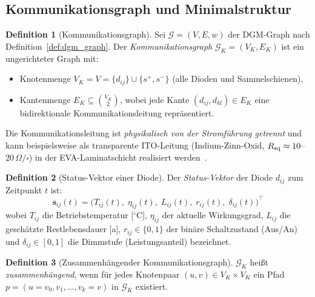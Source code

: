 ﻿\documentclass[a4paper,12pt]{article}
\theoremstyle{definition}
\newtheorem{definition}{Definition}[section]
\theoremstyle{remark}
\begin{document}
\subsection{Kommunikationsgraph und Minimalstruktur}
\label{sec:komm_graph}

\begin{definition}[Kommunikationsgraph]
\label{def:komm_graph}
Sei $\mathcal{G} = (V, E, w)$ der DGM-Graph nach Definition~\ref{def:dgm_graph}.
Der \emph{Kommunikationsgraph} $\mathcal{G}_K = (V_K, E_K)$ ist ein
ungerichteter Graph mit:
\begin{itemize}
  \item Knotenmenge $V_K = V = \{d_{ij}\} \cup \{s^+, s^-\}$ (alle Dioden
        und Sammelschienen),
  \item Kantenmenge $E_K \subseteq \binom{V_K}{2}$, wobei jede Kante
        $(d_{ij}, d_{kl}) \in E_K$ eine bidirektionale Kommunikationsleitung
        repräsentiert.
\end{itemize}
Die Kommunikationsleitung ist \emph{physikalisch von der Stromführung getrennt}
und kann beispielsweise als transparente ITO-Leitung
(Indium-Zinn-Oxid, $R_{\rm sq} \approx 10$--$20\,\Omega/\square$)
in der EVA-Laminatschicht realisiert werden~\cite{Beckhoff2023}.
\end{definition}

\begin{definition}[Status-Vektor einer Diode]
\label{def:statusvektor}
Der \emph{Status-Vektor} der Diode $d_{ij}$ zum Zeitpunkt $t$ ist:
\begin{equation}
  \mathbf{s}_{ij}(t) = \bigl(T_{ij}(t),\; \eta_{ij}(t),\; L_{ij}(t),\;
                              r_{ij}(t),\; \delta_{ij}(t)\bigr)^{\!\top}
  \label{eq:statusvektor}
\end{equation}
wobei $T_{ij}$ die Betriebstemperatur [$^{\circ}$C], $\eta_{ij}$ der aktuelle
Wirkungsgrad, $L_{ij}$ die geschätzte Restlebensdauer [a],
$r_{ij} \in \{0, 1\}$ der binäre Schaltzustand (Aus/An) und
$\delta_{ij} \in [0,1]$ die Dimmstufe (Leistungsanteil) bezeichnet.
\end{definition}

\begin{definition}[Zusammenhängender Kommunikationsgraph]
$\mathcal{G}_K$ heißt \emph{zusammenhängend}, wenn für jedes Knotenpaar
$(u, v) \in V_K \times V_K$ ein Pfad $p = (u = v_0, v_1, \ldots, v_k = v)$
in $\mathcal{G}_K$ existiert.
\end{definition}
\end{document}
